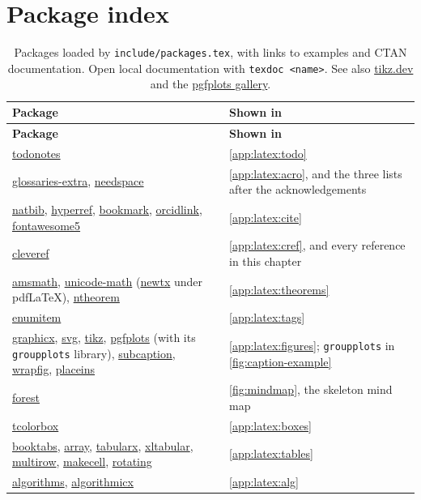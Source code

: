 \section{Package index}\label{app:latex:index}
\newcommand{\ctan}[1]{\href{https://ctan.org/pkg/#1}{#1}}
\begin{xltabular}{\linewidth}{>{\ttfamily\raggedright\arraybackslash{}\hsize}X >{\raggedright\arraybackslash{}\hsize}X}
  \caption{Packages loaded by \texttt{include/packages.tex}, with links to examples and CTAN documentation. Open local documentation with \texttt{texdoc <name>}. See also \href{https://tikz.dev/}{tikz.dev} and the \href{https://pgfplots.sourceforge.net/}{pgfplots gallery}.}\label{tab:package-index}\\
  \toprule
  \normalfont\textbf{Package} & \textbf{Shown in} \\
  \midrule
  \endfirsthead
  \toprule
  \normalfont\textbf{Package} & \textbf{Shown in} \\
  \midrule
  \endhead
  \ctan{todonotes} & \cref{app:latex:todo} \\
  \ctan{glossaries-extra}, \ctan{needspace} & \cref{app:latex:acro}, and the three lists after the acknowledgements \\
  \ctan{natbib}, \ctan{hyperref}, \ctan{bookmark}, \ctan{orcidlink}, \ctan{fontawesome5} & \cref{app:latex:cite} \\
  \ctan{cleveref} & \cref{app:latex:cref}, and every reference in this chapter \\
  \ctan{amsmath}, \ctan{unicode-math} (\ctan{newtx} under pdfLaTeX), \ctan{ntheorem} & \cref{app:latex:theorems} \\
  \ctan{enumitem} & \cref{app:latex:tags} \\
  \ctan{graphicx}, \ctan{svg}, \ctan{tikz}, \ctan{pgfplots} (with its \texttt{groupplots} library), \ctan{subcaption}, \ctan{wrapfig}, \ctan{placeins} & \cref{app:latex:figures}; \texttt{groupplots} in \cref{fig:caption-example} \\
  \ctan{forest} & \cref{fig:mindmap}, the skeleton mind map \\
  \ctan{tcolorbox} & \cref{app:latex:boxes} \\
  \ctan{booktabs}, \ctan{array}, \ctan{tabularx}, \ctan{xltabular}, \ctan{multirow}, \ctan{makecell}, \ctan{rotating} & \cref{app:latex:tables} \\
  \ctan{algorithms}, \ctan{algorithmicx} & \cref{app:latex:alg} \\

\end{xltabular}
